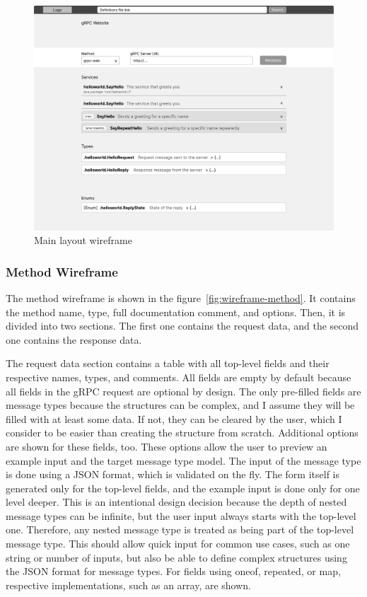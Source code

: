 \begin{figure}[hbt!]
    \centering
    \captionsetup{justification=centering}
    \includegraphics[width=1.0\textwidth]{images/design/wireframes/main-layout}
    \caption{Main layout wireframe}
    \label{fig:wireframe-main-layout}
\end{figure}

\subsubsection{Method Wireframe}
The method wireframe is shown in the figure~\ref{fig:wireframe-method}.
It contains the method name, type, full documentation comment, and options.
Then, it is divided into two sections.
The first one contains the request data, and the second one contains the response data.

The request data section contains a table with all top-level fields and their respective names, types, and comments.
All fields are empty by default because all fields in the gRPC request are optional by design.
The only pre-filled fields are message types because the structures can be complex, and I assume they will be filled with at least some data.
If not, they can be cleared by the user, which I consider to be easier than creating the structure from scratch.
Additional options are shown for these fields, too.
These options allow the user to preview an example input and the target message type model.
The input of the message type is done using a JSON format, which is validated on the fly.
The form itself is generated only for the top-level fields, and the example input is done only for one level deeper.
This is an intentional design decision because the depth of nested message types can be infinite, but the user input always starts with the top-level one.
Therefore, any nested message type is treated as being part of the top-level message type.
This should allow quick input for common use cases, such as one string or number of inputs, but also be able to define complex structures using the JSON format for message types.
For fields using oneof, repeated, or map, respective implementations, such as an array, are shown.

